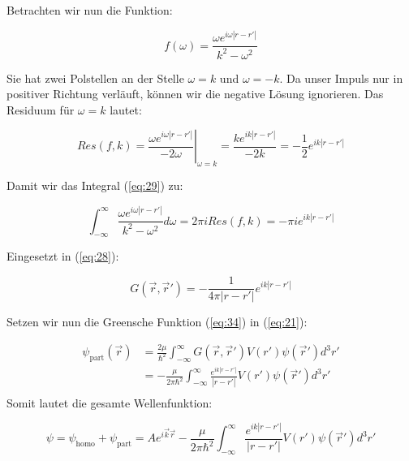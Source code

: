 Betrachten wir nun die Funktion:

\begin{equation}
  \label{eq:31}
  f(\omega) = \frac{\omega e^{i\omega |r-r'| } }{k^2 -\omega^2 }
\end{equation}

Sie hat zwei Polstellen an der Stelle \(\omega = k\) und  \(\omega = -k\). Da unser Impuls nur in positiver Richtung verläuft, können wir die negative Lösung ignorieren. Das Residuum für  \(\omega = k\) lautet:

\begin{equation}
  \label{eq:32}
  Res(f,k) =\left. \frac{\omega e^{i\omega |r-r'| } }{ -2\omega }\right|_{\omega = k} = \frac{k e^{ik |r-r'| } }{ -2 k } =-\frac{1 }{2} e^{ik |r-r'| }
\end{equation}

Damit wir das Integral (\ref{eq:29}) zu:

\begin{equation}
  \label{eq:33}
   \int_{-\infty}^{\infty} \frac{\omega e^{i\omega |r-r'| } }{k^2 -\omega^2 }  d\omega = 2\pi i  Res(f,k) = -\pi i  e^{ik |r-r'| }
\end{equation}

Eingesetzt in (\ref{eq:28}):

\begin{equation}
  \label{eq:34}
   G(\vec r ,\vec r') = - \frac{1}{ 4\pi |r-r'|  }  e^{ik |r-r'| }
\end{equation}

Setzen wir nun die Greensche Funktion (\ref{eq:34}) in (\ref{eq:21}):

\begin{align}
  \label{eq:35}
   \psi_{\text{part}}(\vec r) &= \frac{2\mu}{\hbar^2} \int_{-\infty}^\infty  G(\vec r,\vec r')V(r')\psi(\vec r') d^3 r' \\
&=  -\frac{\mu}{2\pi\hbar^2} \int_{-\infty}^\infty \frac{ e^{ik |r-r'| }}{|r-r'|  }  V(r')\psi(\vec r') d^3 r' \\
\end{align}
Somit lautet die gesamte Wellenfunktion:

\begin{equation}
  \label{eq:36}
  \boxed{ \psi = \psi_{\text{homo}} + \psi_{\text{part}} = Ae^{i\vec k \vec r}  -\frac{\mu}{2\pi\hbar^2} \int_{-\infty}^\infty \frac{ e^{ik |r-r'| }}{|r-r'|  }  V(r')\psi(\vec r') d^3 r' }
\end{equation}



